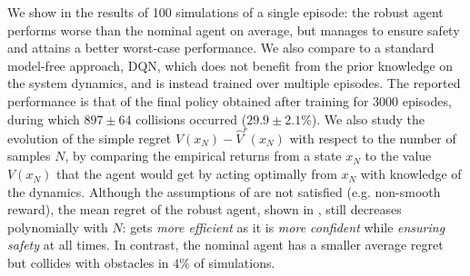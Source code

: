 \documentclass{article}
\begin{document}
We show in  the results of 100 simulations of a single episode: the robust agent performs worse than the nominal agent on average, but manages to ensure safety and attains a better worst-case performance. We also compare to a standard model-free approach, DQN, which does not benefit from the prior knowledge on the system dynamics, and is instead trained over multiple episodes. The reported performance is that of the final policy obtained after training for 3000 episodes, during which $897\pm64$ collisions occurred ($29.9\pm2.1$\%).
We also study the evolution of the simple regret $V(x_N) - \hat{V}^r(x_N)$ with respect to the number of samples $N$, by comparing the empirical returns from a state $x_N$ to the value $V(x_N)$ that the agent would get by acting optimally from $x_N$ with knowledge of the dynamics. Although the assumptions of  are not satisfied (e.g. non-smooth reward), the mean regret of the robust agent, shown in , still decreases polynomially with $N$:  gets \emph{more efficient} as it is \emph{more confident} while \emph{ensuring safety} at all times. In contrast, the nominal agent has a smaller average regret but collides with obstacles in $4\%$ of simulations. 
\end{document}
